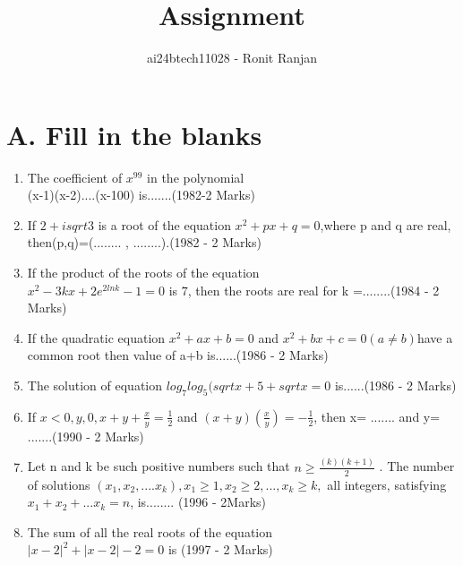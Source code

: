 \documentclass[journal,12pt,twocolumn]{IEEEtran}
\theoremstyle{remark}
\begin{document}

\vspace{3cm}

\title{Assignment}
\author{ai24btech11028 - Ronit Ranjan}
\maketitle
\newpage
\bigskip
\section*{A. Fill in the blanks}
\begin{enumerate}
    \item The coefficient of $x^{99}$ in the polynomial\\ (x-1)(x-2)....(x-100) is.......\hfill (1982-2 Marks)
      
    \item If $2+isqrt{3}$ is a root of the equation $x^2 + px +q =0$,where p and q are real, then(p,q)=(........ , ........).\hfill (1982 - 2 Marks)
    
    \item If the product of the roots of the equation\\ $x^2 -3kx +2e^{2lnk} -1=0$ is $7$, then the roots are real for k =........\hfill (1984 - 2 Marks)
    
    \item If the quadratic equation $x^2 + ax +b=0$ and $x^2 + bx + c=0 (a \ne b)$have a common root then value of a+b is......\hfill (1986 - 2 Marks)
    
    \item The solution of equation $log_{7}log_{5}(sqrt{x+5}+sqrt{x} = 0$ is......\hfill (1986 - 2 Marks)
    
    \item If $x<0, y,0, x + y + \frac{x}{y} = \frac{1}{2}$ and $(x+y)(\frac{x
    }{y}) = -\frac{1}{2}$, then x= ....... and y= .......\hfill (1990 - 2 Marks)
    
    \item Let n and k be such positive numbers such that $n \geq \frac{(k)(k+1)}{2}$ . The number of solutions $(x_1,x_2,....x_k), x_1 \geq 1, x_2 \geq 2,...,x_k \geq k, $ all integers, satisfying $x_1+x_2+...x_k = n$, is........  \hfill (1996 - 2Marks) 
    \item The sum of all the real roots of the equation\\$|x-2|^2+|x-2|-2 = 0$ is \hfill (1997 - 2 Marks)
\end{enumerate}
\end{document}

